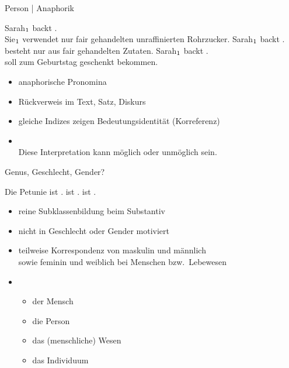 \begin{frame}
  {Person | Anaphorik}
  \pause
  \begin{exe}
    \ex \alert{Sarah$_{\textnormal{1}}$} backt  .\\
      \alert{Sie$_{\textnormal{1}}$} verwendet nur fair gehandelten unraffinierten Rohrzucker.
    \pause
      \ex \alert{Sarah$_{\textnormal{1}}$} backt  .\\
       besteht nur aus fair gehandelten Zutaten.
    \pause
      \ex \alert{Sarah$_{\textnormal{1}}$} backt  .\\
       soll  zum Geburtstag geschenkt bekommen.
  \end{exe}
  \Halbzeile
  \pause
  \begin{itemize}[<+->]
    \item anaphorische Pronomina
    \item Rückverweis im Text, Satz, Diskurs
    \item gleiche Indizes zeigen Bedeutungsidentität (Korreferenz)
    \item {}\\
      Diese Interpretation kann möglich oder unmöglich sein.
  \end{itemize}
\end{frame}

\begin{frame}
  {Genus, Geschlecht, Gender?}
  \pause
  \begin{exe}
    \ex \label{ex:genus039}
    \begin{xlist}
      \ex \alert{Die Petunie} ist .
      \ex {} ist .
      \ex {} ist .
    \end{xlist}
  \end{exe}
  \pause
  \Halbzeile
  \begin{itemize}[<+->]
    \item reine Subklassenbildung beim Substantiv
    \item nicht in Geschlecht oder Gender motiviert
    \item teilweise Korrespondenz von maskulin und männlich\\
      sowie feminin und weiblich bei Menschen bzw.\ Lebewesen
    \item {}
      \begin{itemize}[<+->]
        \item der Mensch
        \item die Person
        \item das (menschliche) Wesen
        \item das Individuum
      \end{itemize}
  \end{itemize}
\end{frame}


